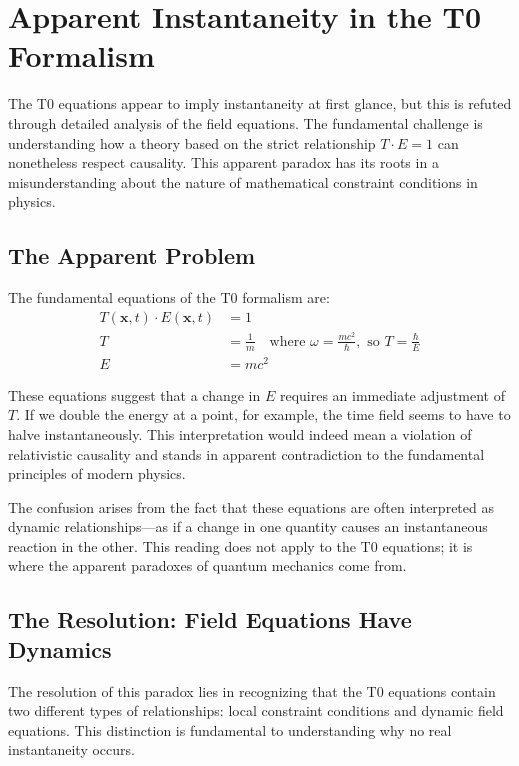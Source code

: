 	\section{Apparent Instantaneity in the T0 Formalism}
	
	The T0 equations appear to imply instantaneity at first glance, but this is refuted through detailed analysis of the field equations. The fundamental challenge is understanding how a theory based on the strict relationship $T \cdot E = 1$ can nonetheless respect causality. This apparent paradox has its roots in a misunderstanding about the nature of mathematical constraint conditions in physics.
	
	\subsection{The Apparent Problem}
	
	The fundamental equations of the T0 formalism are:
	\begin{align}
		T(\mathbf{x},t) \cdot E(\mathbf{x},t) &= 1 \label{eq:TE_constraint} \\
		T &= \frac{1}{m} \quad \text{where } \omega = \frac{mc^2}{\hbar}, \text{ so } T = \frac{\hbar}{E} \label{eq:T_definition} \\
		E &= mc^2 \label{eq:E_definition}
	\end{align}
	
	These equations suggest that a change in $E$ requires an immediate adjustment of $T$. If we double the energy at a point, for example, the time field seems to have to halve instantaneously. This interpretation would indeed mean a violation of relativistic causality and stands in apparent contradiction to the fundamental principles of modern physics.
	
	The confusion arises from the fact that these equations are often interpreted as dynamic relationships—as if a change in one quantity causes an instantaneous reaction in the other. This reading does not apply to the T0 equations; it is where the apparent paradoxes of quantum mechanics come from.
	
	\subsection{The Resolution: Field Equations Have Dynamics}
	
	The resolution of this paradox lies in recognizing that the T0 equations contain two different types of relationships: local constraint conditions and dynamic field equations. This distinction is fundamental to understanding why no real instantaneity occurs.
	
